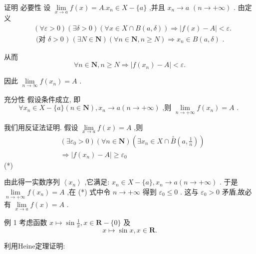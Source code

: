 证明 必要性 设 $\mathop{\lim }\limits_{{x \rightarrow  a}}f\left( x\right)  = A.{x}_{n} \in  X - \{ a\}$ ,并且 ${x}_{n} \rightarrow  a$  $\left( {n \rightarrow   + \infty }\right)$ . 由定义
\begin{align*}
	&\left( {\forall \varepsilon  > 0}\right) \left( {\exists \delta  > 0}\right) \left( {\forall x \in  X \cap  B\left( {a,\delta }\right) }\right)  \Rightarrow  \left| {f\left( x\right)  - A}\right|  < \varepsilon .\\
	&\text{ (对 }\delta  > 0\text{ ) }\left( {\exists N \in  \mathbf{N}}\right) \left( {\forall n \in  \mathbf{N},n \geq  N}\right)  \Rightarrow  {x}_{n} \in  B\left( {a,\delta }\right) \text{ . }
\end{align*}

从而
$$\forall n \in  \mathbf{N},n \geq  N \Rightarrow  \left| {f\left( {x}_{n}\right)  - A}\right|  < \varepsilon .$$

因此 $\mathop{\lim }\limits_{{n \rightarrow  \infty }}f\left( {x}_{n}\right)  = A$ .

充分性 假设条件成立, 即
$$\forall {x}_{n} \in  X - \{ a\} \left( {n \in  \mathbf{N}}\right) ,{x}_{n} \rightarrow  a\left( {n \rightarrow   + \infty }\right) \text{ ,则 }\mathop{\lim }\limits_{{n \rightarrow   + \infty }}f\left( {x}_{n}\right)  = A\text{ . }$$

我们用反证法证明. 假设 $\mathop{\lim }\limits_{{x \rightarrow  a}}f\left( x\right)  = A$ ,则
\begin{align*}
	&\left( {\exists {\varepsilon }_{0} > 0}\right) \left( {\forall n \in  \mathbf{N}}\right) \left( {\exists {x}_{n} \in  X \cap  \overset{ \circ  }{B}\left( {a,\frac{1}{n}}\right) }\right)\\
	&\Rightarrow  \left| {f\left( {x}_{n}\right)  - A}\right|  \geq  {\varepsilon }_{0}
\end{align*}
(*)

由此得一实数序列 $\left\langle  {x}_{n}\right\rangle$ ,它满足: ${x}_{n} \in  X - \{ a\} ,{x}_{n} \rightarrow  a\left( {n \rightarrow   + \infty }\right)$ . 于是 $\mathop{\lim }\limits_{{n \rightarrow   + \infty }}f\left( {x}_{n}\right)  = A$ ,在 (*) 式中令 $n \rightarrow   + \infty$ 得到 ${\varepsilon }_{0} \leq  0$ . 这与 ${\varepsilon }_{0} > 0$ 矛盾,故必有 $\mathop{\lim }\limits_{{x \rightarrow  a}}f\left( x\right)  = A$ .

例 1 考虑函数 $x \mapsto  \sin \frac{1}{x},x \in  \mathbf{R} - \{ 0\}$ 及
$$x \mapsto  \sin x,x \in  \mathbf{R}.$$

利用Heine定理证明:


